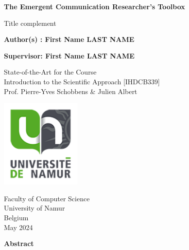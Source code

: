 \documentclass[a4paper]{scrartcl}
\begin{document}
	

\begin{titlepage}
	\begin{center}
		\vspace*{1cm}
		
		{\LARGE \textbf{The Emergent Communication Researcher's Toolbox}}
		
		\vspace{0.5cm}
		
		{\LARGE Title complement}
		
		\vspace{1.5cm}
		
		\textbf{Author(s) : First Name LAST NAME}
		
		\vspace{0.5cm}
		
		\textbf{Supervisor: First Name LAST NAME}
		
		\vfill
		
		State-of-the-Art for the Course\\
		Introduction to the Scientific Approach [IHDCB339]\\
        Prof. Pierre-Yves Schobbens \& Julien Albert 	
		
        \vspace{0.8cm}
        
		\includegraphics[width=0.3\textwidth]{figures/unamur}
  
		Faculty of Computer Science\\
		University of Namur\\
		Belgium\\
		May 2024
	\end{center}
\end{titlepage}
\newpage
\begin{center}
	\textbf{Abstract}
\end{center}
\end{document}
